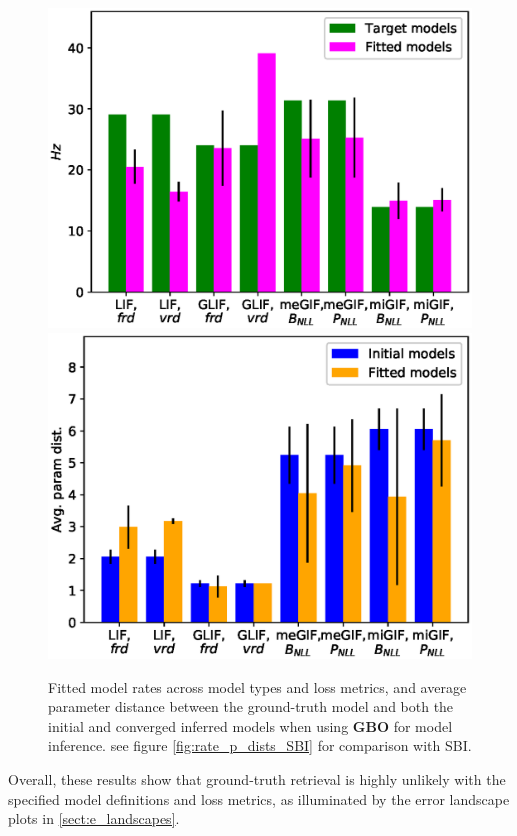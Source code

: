 \documentclass[mphil,deptreport,ianc]{infthesis} %
\begin{document}

\begin{figure}
    \centering
	\includegraphics[width=0.49\columnwidth]{figures/export_rates_saved_all.eps}
	\includegraphics[width=0.49\columnwidth]{figures/export_p_dists_saved_all.eps}
	\caption{Fitted model rates across model types and loss metrics, and average parameter distance between the ground-truth model and both the initial and converged inferred models when using \textbf{GBO} for model inference. see figure \ref{fig:rate_p_dists_SBI} for comparison with SBI.}
	\label{fig:rate_p_dists_GBO}
\end{figure}

Overall, these results show that ground-truth retrieval is highly unlikely with the specified model definitions and loss metrics, as illuminated by the error landscape plots in \ref{sect:e_landscapes}.
\end{document}
